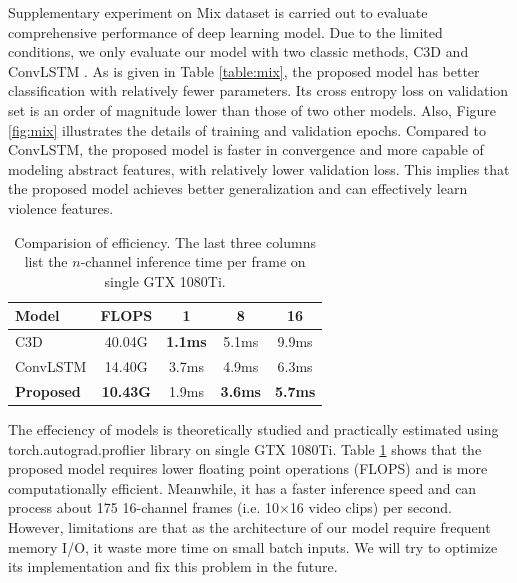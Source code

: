 \documentclass[10pt,twocolumn,letterpaper]{article}
\begin{document}

Supplementary experiment on Mix dataset is carried out to evaluate comprehensive performance of deep learning model.
Due to the limited conditions, we only evaluate our model with two classic methods, C3D \cite{3dcnn_1} and ConvLSTM \cite{convlstm_sudh}. 
As is given in Table \ref{table:mix}, the proposed model has better classification with relatively fewer parameters.
Its cross entropy loss on validation set is an order of magnitude lower than those of two other models.
Also, Figure \ref{fig:mix} illustrates the details of training and validation epochs. 
Compared to ConvLSTM, the proposed model is faster in convergence and more capable of modeling abstract features, with relatively lower validation loss.
This implies that the proposed model achieves better generalization and can effectively learn violence features.


\begin{table}
\begin{center}
\caption{Comparision of efficiency. The last three columns list the $n$-channel inference time per frame on single GTX 1080Ti.}
\label{table:efficiency}
\begin{tabular}{lcccc}
\hline
\textbf{Model} & \textbf{FLOPS} & \textbf{1} & \textbf{8} & \textbf{16}\\
\hline\hline
C3D \cite{3dcnn_1} & 40.04G & \textbf{1.1ms} & 5.1ms & 9.9ms \\
ConvLSTM \cite{convlstm_sudh} & 14.40G & 3.7ms & 4.9ms & 6.3ms \\
\textbf{Proposed} & \textbf{10.43G} & 1.9ms & \textbf{3.6ms} & \textbf{5.7ms} \\
\hline
\end{tabular}
\end{center}
\end{table}


The effeciency of models is theoretically studied and practically estimated using torch.autograd.proflier library on single GTX 1080Ti.
Table \ref{table:efficiency} shows that the proposed model requires lower floating point operations (FLOPS) and is more computationally efficient.
Meanwhile, it has a faster inference speed and can process about 175 16-channel frames (i.e. 10$\times$16 video clips) per second.
However, limitations are that as the architecture of our model require frequent memory I/O, it waste more time on small batch inputs. 
We will try to optimize its implementation and fix this problem in the future.
\end{document}
